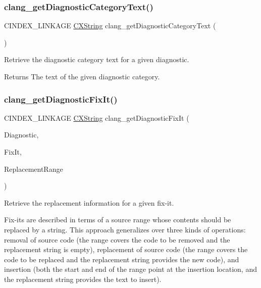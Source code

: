 \subsubsection{\texorpdfstring{clang\+\_\+get\+Diagnostic\+Category\+Text()}{clang\_getDiagnosticCategoryText()}}
{\footnotesize\ttfamily C\+I\+N\+D\+E\+X\+\_\+\+L\+I\+N\+K\+A\+GE \hyperlink{structCXString}{C\+X\+String} clang\+\_\+get\+Diagnostic\+Category\+Text (\begin{DoxyParamCaption}\item[{\hyperlink{group__CINDEX__DIAG_ga44bb8aba7c40590ad25d1763c4fbff7f}{C\+X\+Diagnostic}}]{ }\end{DoxyParamCaption})}



Retrieve the diagnostic category text for a given diagnostic. 

\begin{DoxyReturn}{Returns}
The text of the given diagnostic category. 
\end{DoxyReturn}
\mbox{\label{group__CINDEX__DIAG_gadf990bd68112475c5c07b19c1fe3938a}} 
\subsubsection{\texorpdfstring{clang\+\_\+get\+Diagnostic\+Fix\+It()}{clang\_getDiagnosticFixIt()}}
{\footnotesize\ttfamily C\+I\+N\+D\+E\+X\+\_\+\+L\+I\+N\+K\+A\+GE \hyperlink{structCXString}{C\+X\+String} clang\+\_\+get\+Diagnostic\+Fix\+It (\begin{DoxyParamCaption}\item[{\hyperlink{group__CINDEX__DIAG_ga44bb8aba7c40590ad25d1763c4fbff7f}{C\+X\+Diagnostic}}]{Diagnostic,  }\item[{unsigned}]{Fix\+It,  }\item[{\hyperlink{structCXSourceRange}{C\+X\+Source\+Range} $\ast$}]{Replacement\+Range }\end{DoxyParamCaption})}



Retrieve the replacement information for a given fix-\/it. 

Fix-\/its are described in terms of a source range whose contents should be replaced by a string. This approach generalizes over three kinds of operations\+: removal of source code (the range covers the code to be removed and the replacement string is empty), replacement of source code (the range covers the code to be replaced and the replacement string provides the new code), and insertion (both the start and end of the range point at the insertion location, and the replacement string provides the text to insert).


